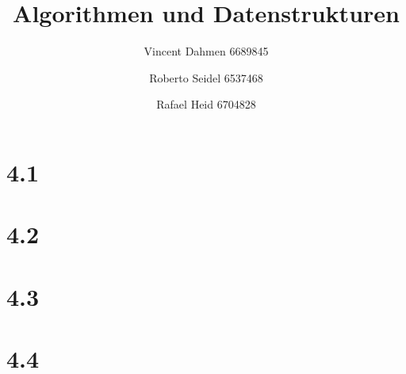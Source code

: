 \documentclass[12pt,a4paper]{article}
\title{Algorithmen und Datenstrukturen}
\author{Vincent Dahmen 6689845 \and Roberto Seidel 6537468 \and Rafael Heid 6704828}
\begin{document}
\maketitle{}


\section*{4.1}


\section*{4.2}


\section*{4.3}


\section*{4.4}

\end{document}
